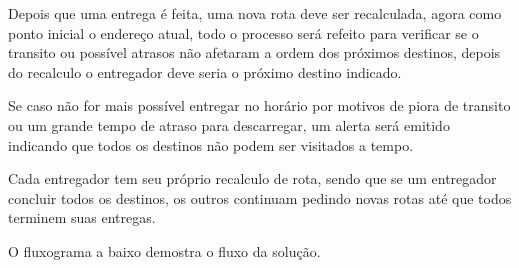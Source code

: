 Depois que uma entrega é feita, uma nova rota deve ser recalculada, agora como ponto inicial o endereço atual, todo o processo será refeito para verificar se o transito ou possível atrasos não afetaram a ordem dos próximos destinos, depois do recalculo o entregador deve seria o próximo destino indicado.

Se caso não for mais possível entregar no horário por motivos de piora de transito ou um grande tempo de atraso para descarregar, um alerta será emitido indicando que todos os destinos não podem ser visitados a tempo.

Cada entregador tem seu próprio recalculo de rota, sendo que se um entregador concluir todos os destinos, os outros continuam pedindo novas rotas até que todos terminem suas entregas.

O fluxograma a baixo demostra o fluxo da solução.

\begin{center}
    \label{fig:FluxoSoftware}
\end{center}

